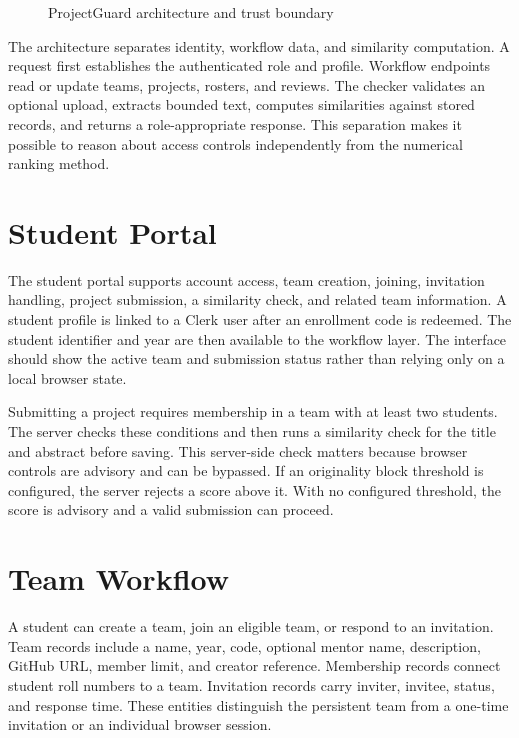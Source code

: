 \documentclass[12pt,a4paper]{report}
\begin{document}
\begin{figure}[htbp]
\centering
{}
\caption{ProjectGuard architecture and trust boundary}
\label{fig:architecture}
\end{figure}
The architecture separates identity, workflow data, and similarity computation. A request first establishes the authenticated role and profile. Workflow endpoints read or update teams, projects, rosters, and reviews. The checker validates an optional upload, extracts bounded text, computes similarities against stored records, and returns a role-appropriate response. This separation makes it possible to reason about access controls independently from the numerical ranking method.

\section{Student Portal}
The student portal supports account access, team creation, joining, invitation handling, project submission, a similarity check, and related team information. A student profile is linked to a Clerk user after an enrollment code is redeemed. The student identifier and year are then available to the workflow layer. The interface should show the active team and submission status rather than relying only on a local browser state.

Submitting a project requires membership in a team with at least two students. The server checks these conditions and then runs a similarity check for the title and abstract before saving. This server-side check matters because browser controls are advisory and can be bypassed. If an originality block threshold is configured, the server rejects a score above it. With no configured threshold, the score is advisory and a valid submission can proceed.

\section{Team Workflow}
A student can create a team, join an eligible team, or respond to an invitation. Team records include a name, year, code, optional mentor name, description, GitHub URL, member limit, and creator reference. Membership records connect student roll numbers to a team. Invitation records carry inviter, invitee, status, and response time. These entities distinguish the persistent team from a one-time invitation or an individual browser session.
\end{document}
